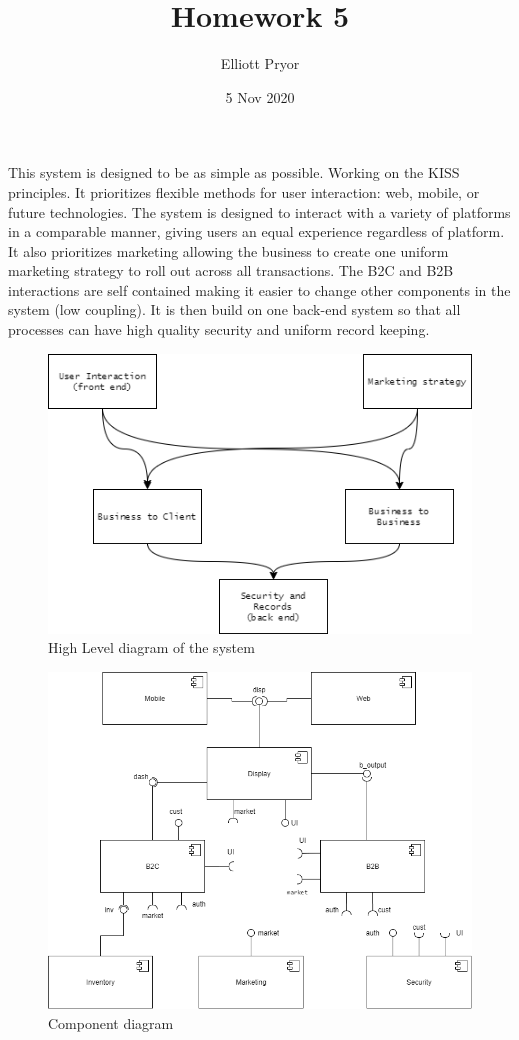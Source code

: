 \documentclass[11pt]{article}
\title{Homework 5}
\author{Elliott Pryor}
\date{5 Nov 2020}
\begin{document}
\maketitle


This system is designed to be as simple as possible. Working on the KISS principles. It prioritizes flexible methods for user interaction: web, mobile, or future technologies. 
The system is designed to interact with a variety of platforms in a comparable manner, giving users an equal experience regardless of platform.
It also prioritizes marketing allowing the business to create one uniform marketing strategy to roll out across all transactions.
The B2C and B2B interactions are self contained making it easier to change other components in the system (low coupling). 
It is then build on one back-end system so that all processes can have high quality security and uniform record keeping. 

\begin{figure}[H]
    \centering
    \includegraphics[scale = 0.7]{./p1_high_level.png}
    \caption{High Level diagram of the system}
    \label{fig:high level}
\end{figure}

\newpage
{}
\begin{figure}[H]
    \centering
    \includegraphics[width = \linewidth]{./p2_component.png}
    \caption{Component diagram}
    \label{fig:component}
\end{figure}
\end{document}
